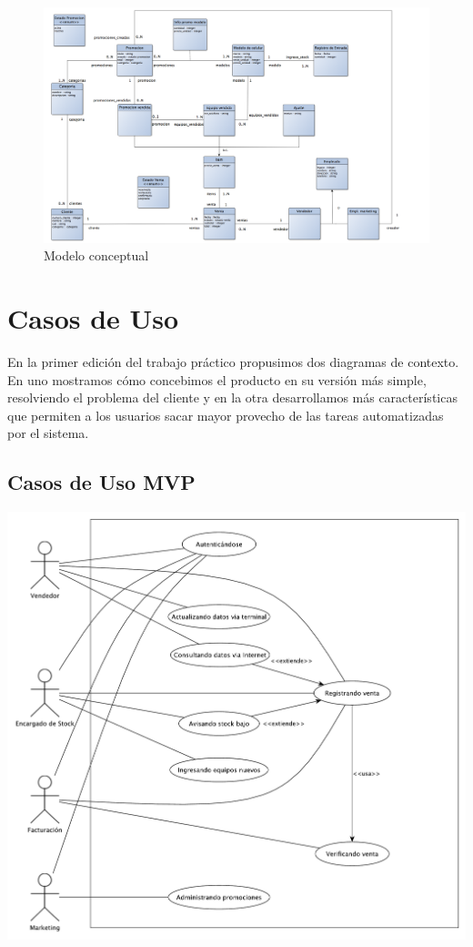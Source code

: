 \clearpage

\begin{figure}[h!]
  \centering
  \includegraphics[width=1.5\textwidth, angle=90]{./imagenes/modelo_conceptual.png}
  \caption{Modelo conceptual}
  \label{fig:modelo_conceptual}
\end{figure}

\clearpage

\section{Casos de Uso}

En la primer edición del trabajo práctico propusimos dos diagramas de contexto. En uno mostramos cómo concebimos el producto en su versión más simple, resolviendo el problema del cliente y en la otra desarrollamos más características que permiten a los usuarios sacar mayor provecho de las tareas automatizadas por el sistema.

\subsection{Casos de Uso MVP}

\includegraphics[width=1\textwidth]{./imagenes/casos_de_uso_mvp.pdf}

